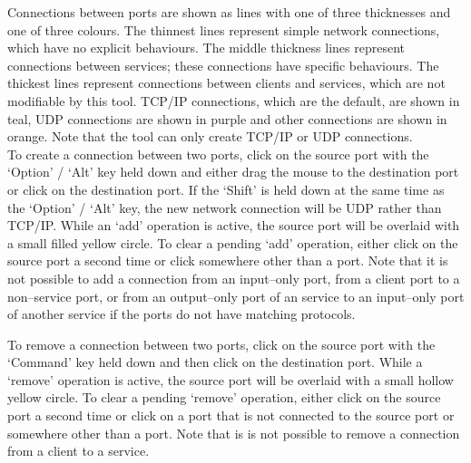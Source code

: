 Connections between ports are shown as lines with one of three thicknesses and one of
three colours.
The thinnest lines represent simple \yarp{} network connections, which have no explicit
behaviours.
The middle thickness lines represent connections between  services; these
connections have specific behaviours.
The thickest lines represent connections between clients and services, which are not
modifiable by this tool.
TCP/IP connections, which are the default, are shown in teal, UDP connections are shown in
purple and other connections are shown in orange.
Note that the tool can only create TCP/IP or UDP connections.\\

To create a connection between two ports, click on the source port with the `Option' /
`Alt' key held down and either drag the mouse to the destination port or click on the
destination port.
If the `Shift' is held down at the same time as the `Option' / `Alt' key, the new
network connection will be UDP rather than TCP/IP.
While an `add' operation is active, the source port will be overlaid with a small filled
yellow circle.
To clear a pending `add' operation, either click on the source port a second time or click
somewhere other than a port.
Note that it is not possible to add a connection from an input--only port, from a client
port to a non--service port, or from an output--only port of an  service to
an input--only port of another  service if the ports do not have matching
protocols.


\clearpage
{}

To remove a connection between two ports, click on the source port with the `Command' key
held down and then click on the destination port.
While a `remove' operation is active, the source port will be overlaid with a small
hollow yellow circle.
To clear a pending `remove' operation, either click on the source port a second time or
click on a port that is not connected to the source port or somewhere other than a port.
Note that is is not possible to remove a connection from a client to a service.

